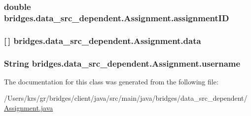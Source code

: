 \subsubsection[{assignment\+I\+D}]{\setlength{\rightskip}{0pt plus 5cm}double bridges.\+data\+\_\+src\+\_\+dependent.\+Assignment.\+assignment\+I\+D}\label{classbridges_1_1data__src__dependent_1_1_assignment_a88c98da9e5ba6f8d83326d6fbae659d8}
\hypertarget{classbridges_1_1data__src__dependent_1_1_assignment_a23d503c5e6eae939bb8262dc8e18c259}{}
\subsubsection[{data}]{ \mbox{[}$\,$\mbox{]} bridges.\+data\+\_\+src\+\_\+dependent.\+Assignment.\+data}\label{classbridges_1_1data__src__dependent_1_1_assignment_a23d503c5e6eae939bb8262dc8e18c259}
\hypertarget{classbridges_1_1data__src__dependent_1_1_assignment_aa7326ba8e0eb02fff4e5b22e4b89e61d}{}
\subsubsection[{username}]{\setlength{\rightskip}{0pt plus 5cm}String bridges.\+data\+\_\+src\+\_\+dependent.\+Assignment.\+username}\label{classbridges_1_1data__src__dependent_1_1_assignment_aa7326ba8e0eb02fff4e5b22e4b89e61d}


The documentation for this class was generated from the following file\+:\begin{DoxyCompactItemize}
\item 
/\+Users/krs/gr/bridges/client/java/src/main/java/bridges/data\+\_\+src\+\_\+dependent/\hyperlink{_assignment_8java}{Assignment.\+java}\end{DoxyCompactItemize}
